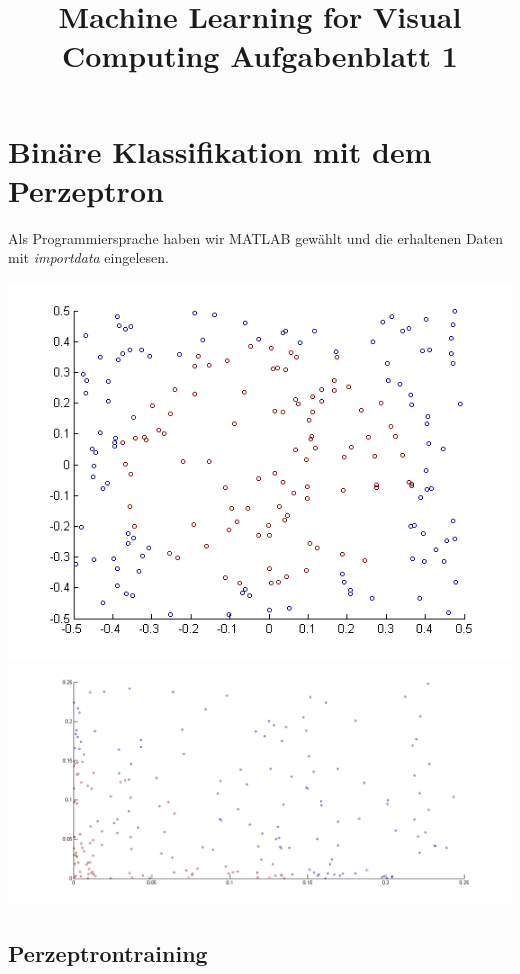 \documentclass[]{report}
\title{Machine Learning for Visual Computing \linebreak
		Aufgabenblatt 1}
\author{}
\begin{document}
\maketitle
\section*{Binäre Klassifikation mit dem Perzeptron}
Als Programmiersprache haben wir MATLAB gewählt und die erhaltenen Daten mit \textit{importdata} eingelesen.
\newline
\begin{minipage}[c]{\linewidth}
	\centering
	\includegraphics[scale=0.75]{perzeptron5.png}
	\includegraphics[scale=0.35]{perzsurprise.png}
\end{minipage}
\newline

\subsection*{Perzeptrontraining}
\end{document}
